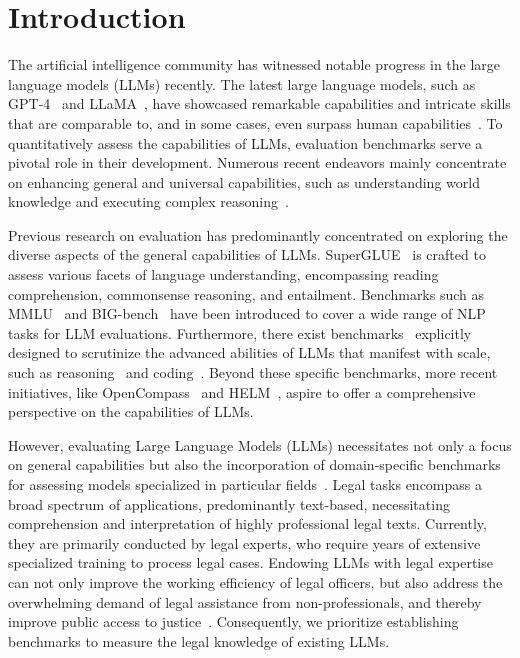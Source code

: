 \section{Introduction}
The artificial intelligence community has witnessed notable progress in the large language models (LLMs) recently. The latest large language models, such as GPT-4~\cite{openai2023gpt4} and LLaMA~\cite{touvron2023llama}, have showcased remarkable capabilities and intricate skills that are comparable to, and in some cases, even surpass human capabilities~\cite{huang2023chatgpt}.
To quantitatively assess the capabilities of LLMs, evaluation benchmarks serve a pivotal role in their development. Numerous recent endeavors mainly concentrate on enhancing general and universal capabilities, such as understanding world knowledge and executing complex reasoning~\cite{zhong2023agieval,yu2023kola}.

Previous research on evaluation has predominantly concentrated on exploring the diverse aspects of the general capabilities of LLMs. SuperGLUE~\cite{wang2019superglue} is crafted to assess various facets of language understanding, encompassing reading comprehension, commonsense reasoning, and entailment. Benchmarks such as MMLU~\cite{hendrycks2020measuring} and BIG-bench~\cite{srivastava2023beyond} have been introduced to cover a wide range of NLP tasks for LLM evaluations. Furthermore, there exist benchmarks~\cite{fu2023chain,suzgun2022challenging,fu2023codeapex,chen2021evaluating} explicitly designed to scrutinize the advanced abilities of LLMs that manifest with scale, such as reasoning~\cite{sawada2023arb} and coding~\cite{lu2021codexglue}. Beyond these specific benchmarks, more recent initiatives, like OpenCompass~\cite{2023opencompass}  and HELM~\cite{liang2022holistic}, aspire to offer a comprehensive perspective on the capabilities of LLMs.

However, evaluating Large Language Models (LLMs) necessitates not only a focus on general capabilities but also the incorporation of domain-specific benchmarks for assessing models specialized in particular fields~\cite{zhao2023domain}. Legal tasks encompass a broad spectrum of applications, predominantly text-based, necessitating comprehension and interpretation of highly professional legal texts. Currently, they are primarily conducted by legal experts, who require years of extensive specialized training to process legal cases. Endowing LLMs with legal expertise can not only improve the working efficiency of legal officers, but also address the overwhelming demand of legal assistance from non-professionals, and thereby improve public access to justice~\cite{cui2022survey,trozze2023large}. Consequently, we prioritize establishing benchmarks to measure the legal knowledge of existing LLMs.

